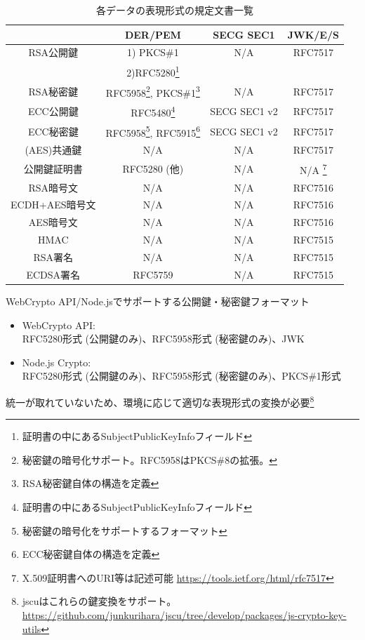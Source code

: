 \documentclass[12pt,dvipdfmx]{beamer}
\begin{document}
\begin{frame}
\begin{center}
\begin{table}
\scriptsize
\caption{各データの表現形式の規定文書一覧}
\begin{tabular}{|c|c|c|c|}
\hline
& DER/PEM & SECG SEC1 & JWK/E/S \\
\hline
\hline
RSA公開鍵 & 1) PKCS\#1 & N/A & RFC7517 \\
 & 2)RFC5280\footnote[frame]{\scriptsize 証明書の中にあるSubjectPublicKeyInfoフィールド} & & \\
\hline
RSA秘密鍵 & RFC5958\footnote[frame]{\scriptsize 秘密鍵の暗号化サポート。RFC5958はPKCS\#8の拡張。}, PKCS\#1\footnote[frame]{\scriptsize RSA秘密鍵自体の構造を定義} & N/A & RFC7517 \\
\hline
ECC公開鍵 & RFC5480\footnote[frame]{\scriptsize 証明書の中にあるSubjectPublicKeyInfoフィールド} & SECG SEC1 v2 & RFC7517 \\
\hline
ECC秘密鍵 & RFC5958\footnote[frame]{\scriptsize 秘密鍵の暗号化をサポートするフォーマット}, RFC5915\footnote[frame]{\scriptsize ECC秘密鍵自体の構造を定義} & SECG SEC1 v2 & RFC7517 \\
\hline
(AES)共通鍵 & N/A & N/A & RFC7517 \\
\hline
公開鍵証明書 & RFC5280 (他) & N/A & N/A \footnote[frame]{\scriptsize X.509証明書へのURI等は記述可能 \url{https://tools.ietf.org/html/rfc7517}} \\
\hline
RSA暗号文 & N/A & N/A & RFC7516\\
\hline
ECDH+AES暗号文 & N/A & N/A & RFC7516\\
\hline
AES暗号文 & N/A & N/A & RFC7516 \\
\hline
HMAC & N/A & N/A & RFC7515\\
\hline
RSA署名 & N/A & N/A & RFC7515\\
\hline
ECDSA署名 & RFC5759 & N/A & RFC7515\\
\hline
\end{tabular}
\end{table}
\end{center}
\end{frame}


\begin{frame}
\begin{exampleblock}{\small WebCrypto API/Node.jsでサポートする公開鍵・秘密鍵フォーマット}
\begin{itemize}
 \item WebCrypto API: \\RFC5280形式 (公開鍵のみ)、RFC5958形式 (秘密鍵のみ)、JWK
 \item Node.js Crypto: \\RFC5280形式 (公開鍵のみ)、RFC5958形式 (秘密鍵のみ)、PKCS\#1形式
\end{itemize}
\end{exampleblock}
統一が取れていないため、環境に応じて適切な表現形式の変換が必要\footnote[frame]{\scriptsize jscuはこれらの鍵変換をサポート。\url{https://github.com/junkurihara/jscu/tree/develop/packages/js-crypto-key-utils}}
\end{frame}
\end{document}
